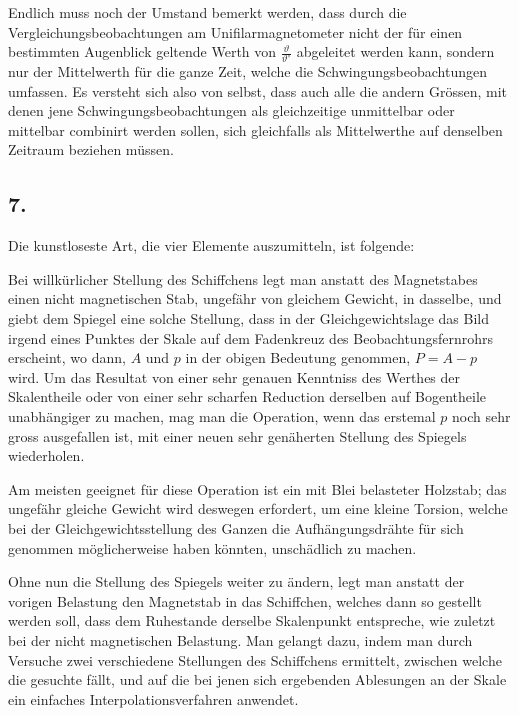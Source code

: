 \documentclass[12pt,a4paper]{article}
\begin{document}
Endlich muss noch der Umstand bemerkt werden, dass durch die Vergleichungsbeobachtungen am Unifilarmagnetometer nicht der für einen bestimmten Augenblick geltende Werth von $\tfrac{\vartheta}{\vartheta^{\circ}}$ abgeleitet werden kann, sondern nur der Mittelwerth für die ganze Zeit, welche die Schwingungsbeobachtungen umfassen. Es versteht sich also von selbst, dass auch alle die andern Grössen, mit denen jene Schwingungsbeobachtungen als gleichzeitige unmittelbar oder mittelbar combinirt werden sollen, sich gleichfalls als Mittelwerthe auf denselben Zeitraum beziehen müssen.

\newpage
\subsection*{7.}

Die kunstloseste Art, die vier Elemente auszumitteln, ist folgende:

Bei willkürlicher Stellung des Schiffchens legt man anstatt des Magnetstabes einen nicht magnetischen Stab, ungefähr von gleichem Gewicht, in dasselbe, und giebt dem Spiegel eine solche Stellung, dass in der Gleichgewichtslage das Bild irgend eines Punktes der Skale auf dem Fadenkreuz des Beobachtungsfernrohrs erscheint, wo dann, $A$ und $p$ in der obigen Bedeutung genommen, $P = A - p$ wird. Um das Resultat von einer sehr genauen Kenntniss des Werthes der Skalentheile oder von einer sehr scharfen Reduction derselben auf Bogentheile unabhängiger zu machen, mag man die Operation, wenn das erstemal $p$ noch sehr gross ausgefallen ist, mit einer neuen sehr genäherten Stellung des Spiegels wiederholen.

Am meisten geeignet für diese Operation ist ein mit Blei belasteter Holzstab; das ungefähr gleiche Gewicht wird deswegen erfordert, um eine kleine Torsion, welche bei der Gleichgewichtsstellung des Ganzen die Aufhängungsdrähte für sich genommen möglicherweise haben könnten, unschädlich zu machen.

Ohne nun die Stellung des Spiegels weiter zu ändern, legt man anstatt der vorigen Belastung den Magnetstab in das Schiffchen, welches dann so gestellt werden soll, dass dem Ruhestande derselbe Skalenpunkt entspreche, wie zuletzt bei der nicht magnetischen Belastung. Man gelangt dazu, indem man durch Versuche zwei verschiedene Stellungen des Schiffchens ermittelt, zwischen welche die gesuchte fällt, und auf die bei jenen sich ergebenden Ablesungen an der Skale ein einfaches Interpolationsverfahren anwendet.
\end{document}
